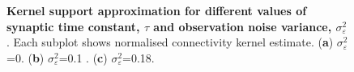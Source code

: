 \documentclass[]{article}
\begin{document}
\begin{figure}
\begin{center}
\end{center}
\caption{{\bf Kernel support approximation for different values of synaptic time constant, $\tau$ and observation noise variance, $\sigma^2_{\varepsilon}$}. Each subplot shows normalised connectivity kernel estimate. (\textbf a) $\sigma_{\varepsilon}^2$=0. (\textbf b) $\sigma_{\varepsilon}^2$=0.1 . (\textbf c) $\sigma_{\varepsilon}^2$=0.18.}
\label{fig:KernelWidthEstimationExperiment}
\end{figure}
\end{document}
